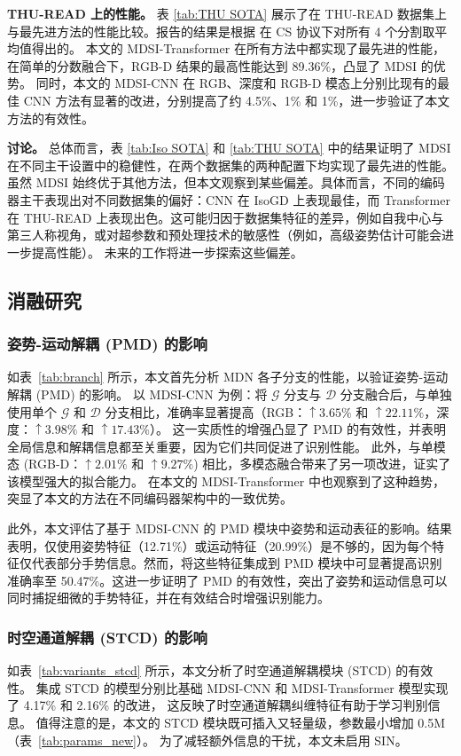 \textbf{THU-READ 上的性能。}
表 \ref{tab:THU SOTA} 展示了在 THU-READ 数据集上与最先进方法的性能比较。报告的结果是根据 \cite{tang2018multi} 在 CS 协议下对所有 4 个分割取平均值得出的。
本文的 MDSI-Transformer 在所有方法中都实现了最先进的性能，在简单的分数融合下，RGB-D 结果的最高性能达到 89.36\%，凸显了 MDSI 的优势。
同时，本文的 MDSI-CNN 在 RGB、深度和 RGB-D 模态上分别比现有的最佳 CNN 方法有显著的改进，分别提高了约 4.5\%、1\% 和 1\%，进一步验证了本文方法的有效性。

\textbf{讨论。}
总体而言，表 \ref{tab:Iso SOTA} 和 \ref{tab:THU SOTA} 中的结果证明了 MDSI 在不同主干设置中的稳健性，在两个数据集的两种配置下均实现了最先进的性能。虽然 MDSI 始终优于其他方法，但本文观察到某些偏差。具体而言，不同的编码器主干表现出对不同数据集的偏好：CNN 在 IsoGD 上表现最佳，而 Transformer 在 THU-READ 上表现出色。这可能归因于数据集特征的差异，例如自我中心与第三人称视角，或对超参数和预处理技术的敏感性（例如，高级姿势估计可能会进一步提高性能）。
未来的工作将进一步探索这些偏差。

\subsection{消融研究}
\subsubsection{姿势-运动解耦 (PMD) 的影响}
如表~\ref{tab:branch} 所示，本文首先分析 MDN 各子分支的性能，以验证姿势-运动解耦 (PMD) 的影响。
以 MDSI-CNN 为例：将 $\mathcal{G}$ 分支与 $\mathcal{D}$ 分支融合后，与单独使用单个 $\mathcal{G}$ 和 $\mathcal{D}$ 分支相比，准确率显著提高（RGB：$\uparrow3.65\%$ 和 $\uparrow22.11\%$，深度：$\uparrow3.98\%$ 和 $\uparrow17.43\%$）。
这一实质性的增强凸显了 PMD 的有效性，并表明全局信息和解耦信息都至关重要，因为它们共同促进了识别性能。
此外，与单模态 (RGB-D：$\uparrow2.01\%$ 和 $\uparrow9.27\%$) 相比，多模态融合带来了另一项改进，证实了该模型强大的拟合能力。
在本文的 MDSI-Transformer 中也观察到了这种趋势，突显了本文的方法在不同编码器架构中的一致优势。

此外，本文评估了基于 MDSI-CNN 的 PMD 模块中姿势和运动表征的影响。结果表明，仅使用姿势特征（12.71\%）或运动特征（20.99\%）是不够的，因为每个特征仅代表部分手势信息。然而，将这些特征集成到 PMD 模块中可显著提高识别准确率至 50.47\%。这进一步证明了 PMD 的有效性，突出了姿势和运动信息可以同时捕捉细微的手势特征，并在有效结合时增强识别能力。

\subsubsection{时空通道解耦 (STCD) 的影响}
\label{sec:ablation_STCD}
如表~\ref{tab:variants_stcd} 所示，本文分析了时空通道解耦模块 (STCD) 的有效性。
集成 STCD 的模型分别比基础 MDSI-CNN 和 MDSI-Transformer 模型实现了 4.17\% 和 2.16\% 的改进，
这反映了时空通道解耦纠缠特征有助于学习判别信息。
值得注意的是，本文的 STCD 模块既可插入又轻量级，参数最小增加 0.5M（表~\ref{tab:params_new}）。
为了减轻额外信息的干扰，本文未启用 SIN。

